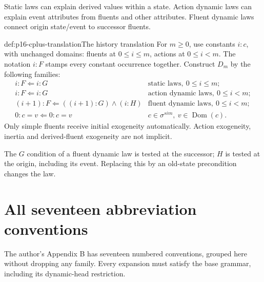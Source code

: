 Static laws can explain derived values within a state. Action dynamic
laws can explain event attributes from fluents and other attributes.
Fluent dynamic laws connect origin state/event to successor fluents.

\begin{hbdefinition}{def:p16-cplus-translation}{The history translation}
For \(m\geq0\), use constants \(i:c\), with unchanged domains:
fluents at \(0\leq i\leq m\), actions at \(0\leq i<m\).
The notation \(i:F\) stamps every constant occurrence together.
Construct \(D_m\) by the following families:
\[
\begin{array}{ll}
 i:F\Leftarrow i:G&
  \text{static laws},\ 0\leq i\leq m;\\
 i:F\Leftarrow i:G&
  \text{action dynamic laws},\ 0\leq i<m;\\
 (i+1):F\Leftarrow((i+1):G)\land(i:H)&
  \text{fluent dynamic laws},\ 0\leq i<m;\\
 0:c=v\Leftarrow0:c=v&
  c\in\sigma^{sim},\ v\in\operatorname{Dom}(c).
\end{array}
\]
Only simple fluents receive initial exogeneity automatically.
Action exogeneity, inertia and derived-fluent exogeneity are not implicit.
\end{hbdefinition}

The \(G\) condition of a fluent dynamic law is tested at the successor;
\(H\) is tested at the origin, including its event. Replacing this by
an old-state precondition changes the law.

\section{All seventeen abbreviation conventions}
\label{sec:p16-cplus-abbreviations}

The author's Appendix B has seventeen numbered conventions, grouped
here without dropping any family. Every expansion must satisfy the
base grammar, including its dynamic-head restriction.

